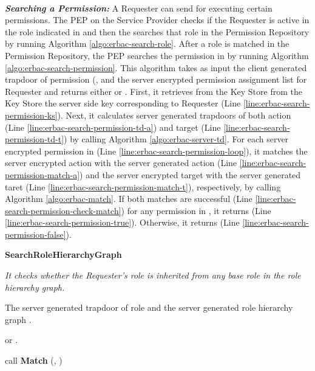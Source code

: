 \documentclass[epsfig,a4paper,11pt,titlepage]{book}
\numberwithin{algorithm}{chapter}
\newcommand{\algofontsize}{\fontsize{11}{12}\selectfont}
\begin{document}
\noindent \\
\noindent \emph{\textbf{Searching a Permission:}} A Requester can send  for executing certain permissions. The \gls{PEP} on the Service Provider checks if the Requester is active in the role indicated in  and then the searches that role in the Permission Repository by running Algorithm \ref{algo:erbac-search-role}. After a role is matched in the Permission Repository, the \gls{PEP} searches the permission in  by running Algorithm \ref{algo:erbac-search-permission}. This algorithm takes as input the client generated trapdoor of permission (,  and the server encrypted permission assignment list  for Requester  and returns either  or . First, it retrieves from the Key Store from the Key Store the server side key  corresponding to Requester  (Line \ref{line:erbac-search-permission-ks}). Next, it calculates server generated trapdoors of both action (Line \ref{line:erbac-search-permission-td-a}) and target (Line \ref{line:erbac-search-permission-td-t}) by calling Algorithm \ref{algo:erbac-server-td}. For each server encrypted permission  in  (Line \ref{line:erbac-search-permission-loop}), it matches the server encrypted action with the server generated action (Line \ref{line:erbac-search-permission-match-a}) and the server encrypted target with the server generated taret (Line \ref{line:erbac-search-permission-match-t}), respectively, by calling Algorithm \ref{algo:erbac-match}. If both matches are successful (Line \ref{line:erbac-search-permission-check-match}) for any permission  in , it returns  (Line \ref{line:erbac-search-permission-true}). Otherwise, it returns  (Line \ref{line:erbac-search-permission-false}).




\begin{algorithm} [htp]
{\algofontsize
\caption{\textbf{SearchRoleHierarchyGraph}}

\label{algo:erbac-search-role-hierarchy-graph}

\begin{algorithmic}[1]

\INPUT \emph{It checks whether the Requester's role is inherited from any base role in the role hierarchy graph.}

\Require The server generated trapdoor of role  and the server generated role hierarchy graph .

\Ensure  or .

\medskip

 \label{line:erbac-search-rh-loop}

	\State  call \textbf{Match} (, ) \label{line:erbac-search-rh-call}

	\If {} \label{line:erbac-search-rh-match}
	
		\Return  \label{line:erbac-search-rh-true}
		
	\EndIf

\EndFor

\Return  \label{line:erbac-search-rh-false}

\end{algorithmic}
}
\end{algorithm}
\end{document}
